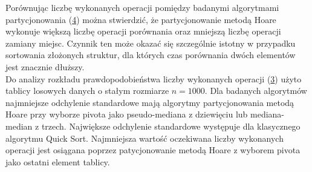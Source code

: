 Porównując liczbę wykonanych operacji pomiędzy badanymi algorytmami partycjonowania (\ref{fig:quick-sort-deterministic-pivot-all}) można stwierdzić, że partycjonowanie metodą Hoare wykonuje większą liczbę operacji porównania oraz mniejszą liczbę operacji zamiany miejsc. Czynnik ten może okazać się szczególnie istotny w przypadku sortowania złożonych struktur, dla których czas porównania dwóch elementów jest znacznie dłuższy.\\
 
Do analizy rozkładu prawdopodobieństwa liczby wykonanych operacji (\ref{fig:quick-sort-deterministic-pivot-density}) użyto tablicy losowych danych o stałym rozmiarze $n = 1000$. Dla badanych algorytmów najmniejsze odchylenie standardowe mają algorytmy partycjonowania metodą Hoare przy wyborze pivota jako pseudo-mediana z dziewięciu lub mediana-median z trzech. Największe odchylenie standardowe występuje dla klasycznego algorytmu Quick Sort. Najmniejsza wartość oczekiwana liczby wykonanych operacji jest osiągana poprzez patycjonowanie metodą Hoare z wyborem pivota jako ostatni element tablicy.


\begin{figure}[]
	\centering
	
	\caption[]{}
	\label{fig:quick-sort-deterministic-pivot-random}
\end{figure}

\begin{figure}[]
	\centering
	
	\caption[]{}
	\label{fig:quick-sort-deterministic-pivot-reversed}
\end{figure}

\begin{figure}[]
	\centering
	
	\caption[]{}
	\label{fig:quick-sort-deterministic-pivot-density}
\end{figure}

\begin{figure}[]
	\centering
	
	\caption[]{}
	\label{fig:quick-sort-deterministic-pivot-all}
\end{figure}

